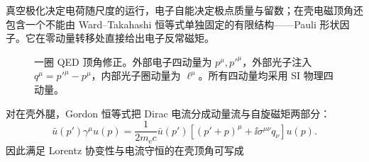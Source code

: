 
真空极化决定电荷随尺度的运行，电子自能决定极点质量与留数；在壳电磁顶角还包含一个不能由 Ward--Takahashi 恒等式单独固定的有限结构——Pauli 形状因子。它在零动量转移处直接给出电子反常磁矩。

\begin{figure}[htbp]
 \centering
 
 \caption{一圈 QED 顶角修正。外部电子四动量为 \(p^\mu,p'^\mu\)，外部光子注入 \(q^\mu=p'^\mu-p^\mu\)，内部光子圈动量为 \(\ell^\mu\)。所有四动量均采用 SI 物理四动量。}
 \label{fig:vertex-correction-r14}
\end{figure}

对在壳外腿，Gordon 恒等式把 Dirac 电流分成动量流与自旋磁矩两部分：
\begin{equation}
 {
 \bar u(p')\gamma^\mu u(p)
 =\frac1{2m_{\mathrm e} c}\bar u(p')
 \left[(p'+p)^\mu+\ii\sigma^{\mu\nu}q_\nu\right]u(p).}
 \label{eq:gordon-identity-r14}
\end{equation}
因此满足 Lorentz 协变性与电流守恒的在壳顶角可写成


